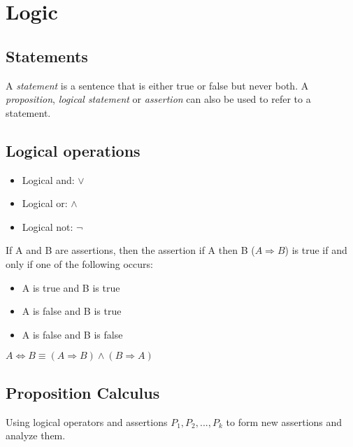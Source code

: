 \section{Logic}
\subsection{Statements}
\begin{definition}[Statement]
    A \emph{statement} is a sentence that is either true or false but never both.
    A \emph{proposition}, \emph{logical statement} or \emph{assertion} can also be used to refer to a statement.
\end{definition}

\subsection{Logical operations}
\begin{itemize}
    \item Logical and: $\lor$
    \item Logical or: $\land$
    \item Logical not: $\lnot$
\end{itemize}
\begin{definition}[Implication]
    If A and B are assertions, then the assertion if A then B ($A \Rightarrow B$)
    is true if and only if one of the following occurs:
    \begin{itemize}
        \item A is true and B is true
        \item A is false and B is true
        \item A is false and B is false
    \end{itemize}
\end{definition}

\begin{definition}
    $A \Leftrightarrow B \equiv (A \Rightarrow B) \land (B \Rightarrow A)$
\end{definition}

\subsection{Proposition Calculus}
Using logical operators and assertions $P_1,P_2,...,P_k$ to form new assertions and analyze them.

